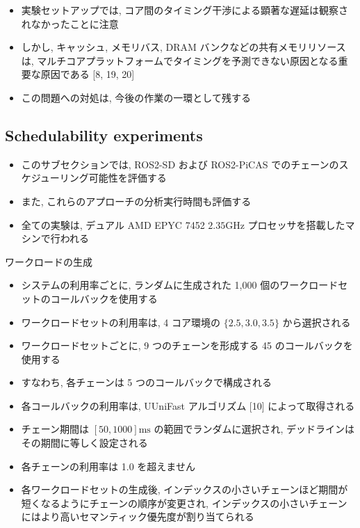 \begin{frame}{}
    \begin{itemize}
        \item 実験セットアップでは, コア間のタイミング干渉による顕著な遅延は観察されなかったことに注意
\item しかし, キャッシュ, メモリバス, DRAM バンクなどの共有メモリリソースは, マルチコアプラットフォームでタイミングを予測できない原因となる重要な原因である [8, 19, 20]
\item この問題への対処は, 今後の作業の一環として残する
    \end{itemize}
\end{frame}


\subsection{Schedulability experiments}
\label{ssec: schedulability experiments}

\begin{frame}{}
    \begin{itemize}
        \item このサブセクションでは, ROS2-SD および ROS2-PiCAS でのチェーンのスケジューリング可能性を評価する
\item また, これらのアプローチの分析実行時間も評価する
\item 全ての実験は, デュアル AMD EPYC 7452 $2.35 \mathrm{GHz}$ プロセッサを搭載したマシンで行われる
    \end{itemize}
\end{frame}

\begin{frame}{ワークロードの生成}
    \begin{itemize}
        \item システムの利用率ごとに, ランダムに生成された 1,000 個のワークロードセットのコールバックを使用する
\item ワークロードセットの利用率は, 4 コア環境の $\{2.5,3.0,3.5\}$ から選択される
\item ワークロードセットごとに, 9 つのチェーンを形成する 45 のコールバックを使用する
\item すなわち, 各チェーンは 5 つのコールバックで構成される
\item 各コールバックの利用率は, UUniFast アルゴリズム [10] によって取得される
\item チェーン期間は $[50,1000] \mathrm{ms}$ の範囲でランダムに選択され, デッドラインはその期間に等しく設定される
\item 各チェーンの利用率は 1.0 を超えません
\item 各ワークロードセットの生成後, インデックスの小さいチェーンほど期間が短くなるようにチェーンの順序が変更され, インデックスの小さいチェーンにはより高いセマンティック優先度が割り当てられる
    \end{itemize}
\end{frame}

